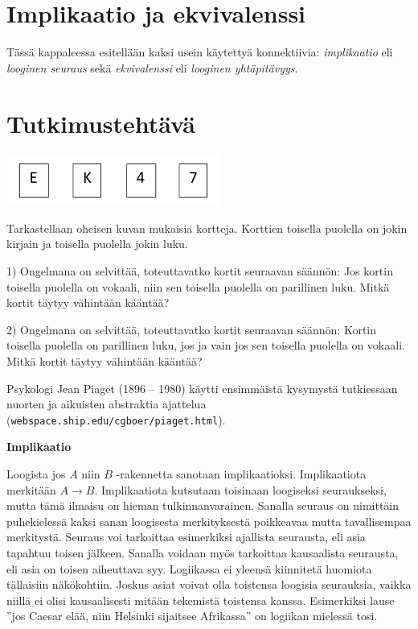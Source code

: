 \newpage


\section{Implikaatio ja ekvivalenssi}
Tässä kappaleessa esitellään kaksi usein käytettyä konnektiivia: {\em implikaatio} eli {\em looginen seuraus} sekä {\em ekvivalenssi} eli {\em looginen yhtäpitävyys}.

\section*{Tutkimustehtävä}

\begin{center}
\includegraphics[width=7cm]{kuvat/piaget}
\end{center}

Tarkastellaan oheisen kuvan mukaisia kortteja. Korttien toisella puolella on jokin kirjain ja toisella puolella jokin luku.

1) Ongelmana on selvittää, toteuttavatko kortit seuraavan säännön: Jos kortin toisella puolella on vokaali, niin sen toisella puolella on parillinen luku. Mitkä kortit täytyy vähintään kääntää?

2) Ongelmana on selvittää, toteuttavatko kortit seuraavan säännön: Kortin toisella puolella on parillinen luku, jos ja vain jos sen toisella puolella on vokaali. Mitkä kortit täytyy vähintään kääntää?

Psykologi Jean Piaget (1896 -- 1980) käytti ensimmäistä kysymystä tutkiessaan nuorten ja aikuisten abstraktia ajattelua\\ ({\tt webspace.ship.edu/cgboer/piaget.html}).

{\bf Implikaatio}

Loogista jos $A$ niin $B$ -rakennetta sanotaan implikaatioksi. Implikaatiota merkitään $A\to B$. Implikaatiota  kutsutaan toisinaan loogiseksi seu\-rauk\-sek\-si, mutta tämä ilmaisu on hieman tulkinnanvarainen. Sanalla seuraus on nimittäin puhekielessä kaksi sanan loogisesta merkityksestä poikkeavaa mutta tavallisempaa merkitystä. Seuraus voi tarkoittaa esimerkiksi ajallista seurausta, eli asia tapahtuu toisen jälkeen. Sanalla voidaan myös tarkoittaa kausaalista seurausta, eli asia on toisen aiheuttava syy. Logiikassa ei yleensä kiinnitetä huomiota tällaisiin näkökohtiin. Joskus asiat voivat olla toistensa loogisia seurauksia, vaikka niillä ei olisi kausaalisesti mitään tekemistä toistensa kanssa. Esimerkiksi lause ''jos Caesar elää, niin Helsinki sijaitsee Afrikassa'' on logiikan mielessä tosi. 

